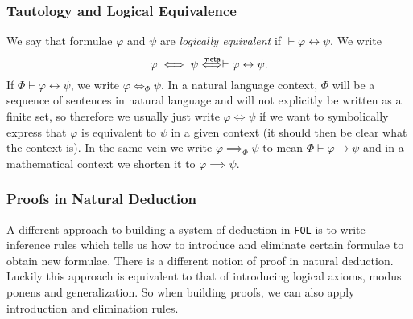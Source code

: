 \subsubsection{Tautology and Logical Equivalence}
We say that formulae $\varphi$ and $\psi$ are \emph{logically equivalent} if $\vdash \varphi \leftrightarrow \psi$. We write 
$$\varphi \iff \psi \mathrel{\overset{\mathsf{meta}}{\Longleftrightarrow}} \vdash \varphi \leftrightarrow \psi.$$
If $\Phi \vdash \varphi \leftrightarrow \psi$, we write $\varphi \iff_\Phi \psi$. In a natural language context, $\Phi$ will be a sequence of sentences in natural language and will not explicitly be written as a finite set, so therefore we usually just write $\varphi \iff \psi$ if we want to symbolically express that $\varphi$ is equivalent to $\psi$ in a given context (it should then be clear what the context is). In the same vein we write $\varphi\implies_\Phi \psi$ to mean $\Phi \vdash \varphi \to \psi$ and in a mathematical context we shorten it to $\varphi \implies \psi$. 
\subsubsection{Proofs in Natural Deduction}
A different approach to building a system of deduction in \verb|FOL| is to write inference rules which tells us how to introduce and eliminate certain formulae to obtain new formulae. There is a different notion of proof in natural deduction. Luckily this approach is equivalent to that of introducing logical axioms, modus ponens and generalization. So when building proofs, we can also apply introduction and elimination rules. 
